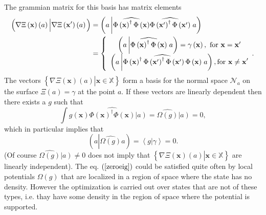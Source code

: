 \documentclass[aps,preprint]{revtex4}%
\begin{document}
The grammian matrix for this basis has matrix elements
\begin{align}
\left(  \overset{}{\nabla\Xi\left(  \mathbf{x}\right)  \left(  a\right)
}\left\vert \overset{}{\nabla\Xi\left(  \mathbf{x}^{\prime}\right)  \left(
a\right)  }\right.  \right)   &  =\left(  a\left\vert \widehat{\Phi\left(
\mathbf{x}\right)  ^{\dagger}\Phi\left(  \mathbf{x}\right)  }\widehat
{\Phi\left(  \mathbf{x}^{\prime}\right)  ^{\dagger}\Phi\left(  \mathbf{x}%
^{\prime}\right)  }\right.  a\right) \nonumber\\
&  =\left\{
\begin{array}
[c]{c}%
\left(  a\left\vert \widehat{\Phi\left(  \mathbf{x}\right)  ^{\dagger}%
\Phi\left(  \mathbf{x}\right)  }\right.  a\right)  =\gamma\left(
\mathbf{x}\right)  ,\text{ for }\mathbf{x=x}^{\prime}\\
\left(  a\left\vert \widehat{\Phi\left(  \mathbf{x}\right)  ^{\dagger}%
\Phi\left(  \mathbf{x}^{\prime}\right)  ^{\dagger}\Phi\left(  \mathbf{x}%
^{\prime}\right)  \Phi\left(  \mathbf{x}\right)  }\right.  a\right)
,\text{for }\mathbf{x\neq x}^{\prime}%
\end{array}
.\right.
\end{align}
The vectors $\left\{  \left.  \overset{}{\nabla\Xi\left(  \mathbf{x}\right)
\left(  a\right)  }\right\vert \mathbf{x\in}\mathbb{X}\right\}  $ form a basis
for the normal space $\mathcal{N}_{a}$ on the surface $\Xi\left(  a\right)
=\gamma$ at the point $a.$ If these vectors are linearly dependent then there
exists a $g$ such that
\begin{equation}
\int g\left(  \mathbf{x}\right)  \widehat{\Phi\left(  \mathbf{x}\right)
^{\dagger}\Phi\left(  \mathbf{x}\right)  }\left\vert \overset{}{a}\right)
=\widehat{\Omega\left(  g\right)  }\left\vert \overset{}{a}\right)  =0,
\label{roeig}%
\end{equation}
which in particular implies that
\begin{equation}
\left(  a\left\vert \widehat{\Omega\left(  g\right)  }\right.  a\right)
=\left\langle \left.  g\right\vert \gamma\right\rangle =0.
\end{equation}
(Of course $\widehat{\Omega\left(  g\right)  }\left\vert \overset{}{a}\right)
\neq0$ does not imply that $\left\{  \left.  \overset{}{\nabla\Xi\left(
\mathbf{x}\right)  \left(  a\right)  }\right\vert \mathbf{x\in}\mathbb{X}%
\right\}  $ are linearly independent). The eq. $\left(  \ref{zeroeig}\right)
$ could be satisfied quite often by local potentials $\Omega\left(  g\right)
$ that are localized in a region of space where the state has no density.
However the optimization is carried out over states that are not of these
types, i.e. thay have some density in the region of space where the potential
is supported.
\end{document}
